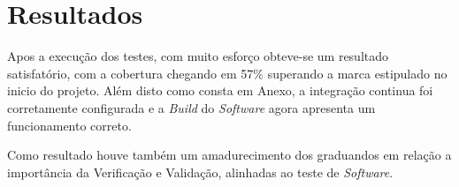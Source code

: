 \chapter{Resultados}

Apos a execução dos testes, com muito esforço obteve-se um resultado satisfatório, com a cobertura chegando em 57\% superando a marca estipulado no inicio do projeto. Além disto como consta em Anexo, a integração continua foi corretamente configurada e a \textit{Build} do \textit{Software} agora apresenta um funcionamento correto.

Como resultado houve também um amadurecimento dos graduandos em relação a importância da Verificação e Validação, alinhadas ao teste de \textit{Software}.